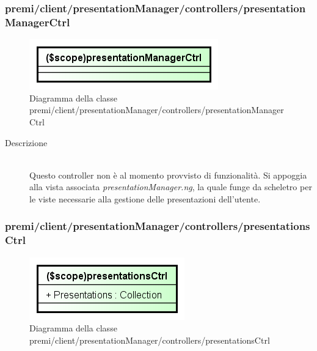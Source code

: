 \subsubsection{premi/client/presentationManager/controllers/presentationManagerCtrl}
\begin{figure}[h]
\begin{center}
\includegraphics[scale=0.90]{img/diacla/presentationManagerCtrl.png}
\caption{Diagramma della classe premi/client/presentationManager/controllers/presentationManagerCtrl}
\end{center}
\end{figure}

\begin{description}
\item[Descrizione] \hfill \\
	Questo controller non è al momento provvisto di funzionalità. Si appoggia alla vista associata \textit{presentationManager.ng}, la quale funge da scheletro per le viste necessarie alla gestione delle presentazioni dell'utente.
\end{description}




\subsubsection{premi/client/presentationManager/controllers/presentationsCtrl}
\begin{figure}[h]
\begin{center}
\includegraphics[scale=0.90]{img/diacla/presentationsCtrl.png}
\caption{Diagramma della classe premi/client/presentationManager/controllers/presentationsCtrl}
\end{center}
\end{figure}

